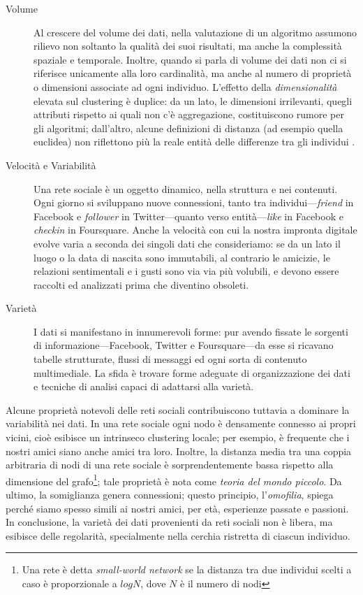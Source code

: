 \begin{description}
\item[Volume]
Al crescere del volume dei dati, nella valutazione di un algoritmo assumono rilievo non soltanto la qualit\`a dei suoi risultati, ma anche la complessit\`a spaziale e temporale. Inoltre, quando si parla di volume dei dati non ci si riferisce unicamente alla loro cardinalit\`a, ma anche al numero di propriet\`a o dimensioni associate ad ogni individuo. L'effetto della \textit{dimensionalit\`a} elevata sul clustering \`e duplice: da un lato, le dimensioni irrilevanti, quegli attributi rispetto ai quali non c'\`e aggregazione, costituiscono rumore per gli algoritmi; dall'altro, alcune definizioni di distanza (ad esempio quella euclidea) non riflettono pi\`u la reale entit\`a delle differenze tra gli individui \cite{Aggarwal01,Beyer99}.
\item[Velocit\`a e Variabilit\`a] Una rete sociale \`e un oggetto dinamico, nella struttura e nei contenuti. Ogni giorno si sviluppano nuove connessioni, tanto tra individui---\textit{friend} in Facebook e \textit{follower} in Twitter---quanto verso entit\`a---\textit{like} in Facebook e \textit{checkin} in Foursquare. Anche la velocit\`a con cui la nostra impronta digitale evolve varia a seconda dei singoli dati che consideriamo: se da un lato il luogo o la data di nascita sono immutabili, al contrario le amicizie, le relazioni sentimentali e i gusti sono via via pi\`u volubili, e devono essere raccolti ed analizzati prima che diventino obsoleti.
\item[Variet\`a] I dati si manifestano in innumerevoli forme: pur avendo fissate le sorgenti di informazione---Facebook, Twitter e Foursquare---da esse si ricavano tabelle strutturate, flussi di messaggi ed ogni sorta di contenuto multimediale. La sfida \`e trovare forme adeguate di organizzazione dei dati e tecniche di analisi capaci di adattarsi alla variet\`a.
\end{description}
Alcune propriet\`a notevoli delle reti sociali contribuiscono tuttavia a dominare la variabilit\`a nei dati. In una rete sociale ogni nodo \`e densamente connesso ai propri vicini, cio\`e esibisce un intrinseco clustering locale; per esempio, \`e frequente che i nostri amici siano anche amici tra loro. Inoltre, la distanza media tra una coppia arbitraria di nodi di una rete sociale \`e sorprendentemente bassa rispetto alla dimensione del grafo\footnote{Una rete \`e detta \textit{small-world network} se la distanza tra due individui scelti a caso \`e proporzionale a $log N$, dove $N$ \`e il numero di nodi}; tale propriet\`a \`e nota come \textit{teoria del mondo piccolo}. Da ultimo, la somiglianza genera connessioni; questo principio, l'\textit{omofilia}, spiega perch\'e siamo spesso simili ai nostri amici, per et\`a, esperienze passate e passioni. In conclusione, la variet\`a dei dati provenienti da reti sociali non \`e libera, ma esibisce delle regolarit\`a, specialmente nella cerchia ristretta di ciascun individuo.\\
